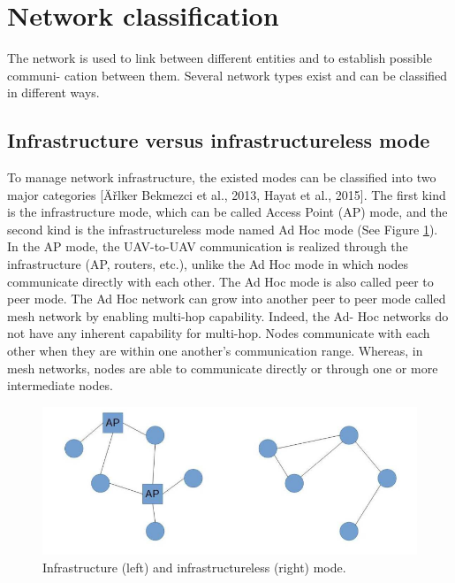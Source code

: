 \documentclass[11pt,openany]{book}
\begin{document}
\section{Network classification}
The network is used to link between diﬀerent entities and to establish possible communi- cation between them. Several network types exist and can be classiﬁed in diﬀerent ways.
\subsection{Infrastructure versus infrastructureless mode}
To manage network infrastructure, the existed modes can be classiﬁed into two major categories [Äřlker Bekmezci et al., 2013, Hayat et al., 2015]. The ﬁrst kind is the infrastructure mode, which can be called Access Point (AP) mode, and the second kind is
the infrastructureless mode named Ad Hoc mode (See Figure \ref{fig:4.1}). In the AP mode, the UAV-to-UAV communication is realized through the infrastructure (AP, routers, etc.), unlike the Ad Hoc mode in which nodes communicate directly with each other. The Ad Hoc mode is also called peer to peer mode. The Ad Hoc network can grow into another peer to peer mode called mesh network by enabling multi-hop capability. Indeed, the Ad- Hoc networks do not have any inherent capability for multi-hop. Nodes communicate with each other when they are within one another’s communication range. Whereas, in mesh networks, nodes are able to communicate directly or through one or more intermediate nodes.
\begin{figure}[H]
    \centering
    \includegraphics[scale=0.4]{assets/4_1.png}
    \caption{Infrastructure (left) and infrastructureless (right) mode.}
    \label{fig:4.1}
\end{figure}
\end{document}

